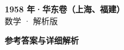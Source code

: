 \documentclass[zihao=-4, a4paper]{ctexart}
\begin{document}
\begin{center}
  {\Large\bfseries 1958 年·华东卷（上海、福建）}\\[4pt]
  {\large 数学 · 解析版}
\end{center}
\medskip
{}

\clearpage
{}
\begin{center}{\Large\bfseries 参考答案与详细解析}\end{center}
\medskip

\end{document}
